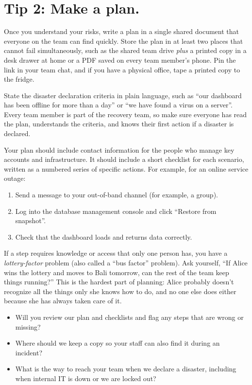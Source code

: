 \documentclass[10pt,letterpaper]{article}
\begin{document}
\section*{Tip 2: Make a plan.}

Once you understand your risks, write a plan in a single shared document that
everyone on the team can find quickly. Store the plan in at least two places
that cannot fail simultaneously, such as the shared team drive \emph{plus} a
printed copy in a desk drawer at home or a PDF saved on every team member's
phone. Pin the link in your team chat, and if you have a physical office, tape a
printed copy to the fridge.

State the disaster declaration criteria in plain language, such as ``our
dashboard has been offline for more than a day'' or ``we have found a virus on a
server''.  Every team member is part of the recovery team, so make sure everyone
has read the plan, understands the criteria, and knows their first action if a
disaster is declared.

Your plan should include contact information for the people who manage key
accounts and infrastructure.  It should include a short checklist for each
scenario, written as a numbered series of specific actions. For example, for an
online service outage:

\begin{enumerate}
\item Send a message to your out-of-band channel (for example, a
   group).
\item Log into the database management console and click ``Restore from
  snapshot''.
\item Check that the dashboard loads and returns data correctly.
\end{enumerate}

\begin{notebox}
  If a step requires knowledge or access that only one person has, you have a
  \emph{lottery-factor} problem (also called a ``bus factor'' problem). Ask
  yourself, ``If Alice wins the lottery and moves to Bali tomorrow, can the rest
  of the team keep things running?''  This is the hardest part of planning: Alice
  probably doesn't recognize all the things only she knows how to do, and no one
  else does either because she has always taken care of it.
\end{notebox}

\begin{notebox}
  \begin{itemize}
  \item Will you review our plan and checklists and flag any steps that are
    wrong or missing?
  \item Where should we keep a copy so your staff can also find it during an
    incident?
  \item What is the way to reach your team when we declare a disaster, including
    when internal IT is down or we are locked out?
  \end{itemize}
\end{notebox}
\end{document}
